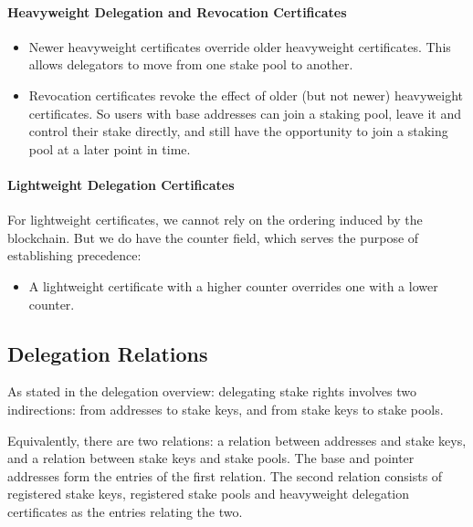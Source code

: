 \documentclass[11pt,a4paper]{article}
\begin{document}
\paragraph{Heavyweight Delegation and Revocation
Certificates}\label{heavyweight-delegation-and-revocation-certificates}

\begin{itemize}
\item
  Newer heavyweight certificates override older heavyweight
  certificates. This allows delegators to move from one stake pool to
  another.
\item
  Revocation certificates revoke the effect of older (but not newer)
  heavyweight certificates. So users with base addresses can join a
  staking pool, leave it and control their stake directly, and still
  have the opportunity to join a staking pool at a later point in time.
\end{itemize}

\paragraph{Lightweight Delegation
Certificates}\label{lightweight-delegation-certificates-1}

For lightweight certificates, we cannot rely on the ordering induced by
the blockchain. But we do have the counter field, which serves the
purpose of establishing precedence:

\begin{itemize}
\item
  A lightweight certificate with a higher counter overrides one with a
  lower counter.
\end{itemize}

\subsection{Delegation Relations}\label{delegation-relations}

As stated in the delegation overview: delegating stake rights involves
two indirections: from addresses to stake keys, and from stake keys to
stake pools.

Equivalently, there are two relations: a relation between addresses and
stake keys, and a relation between stake keys and stake pools. The base
and pointer addresses form the entries of the first relation. The second
relation consists of registered stake keys, registered stake pools and
heavyweight delegation certificates as the entries relating the two.
\end{document}
